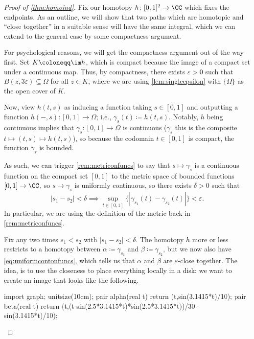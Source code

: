 \begin{proof}[Proof of \autoref{thm:homoind}]
	Fix our homotopy $h\colon [0,1]^2\to\CC$ which fixes the endpoints. As an outline, we will show that two paths which are homotopic and ``close together'' in a suitable sense will have the same integral, which we can extend to the general case by some compactness argument.
	
	For psychological reasons, we will get the compactness argument out of the way first. Set $K\coloneqq \im h$, which is compact because the image of a compact set under a continuous map. Thus, by compactness, there exists $\varepsilon>0$ such that $B(z,3\varepsilon)\subseteq\Omega$ for all $z\in K$, where we are using \autoref{lem:singleepsilon} with $\{\Omega\}$ as the open cover of $K$.

	Now, view $h(t,s)$ as inducing a function taking $s\in[0,1]$ and outputting a function $h(-,s)\colon [0,1]\to\Omega$; i.e., $\gamma_s(t)\coloneqq h(t,s)$. Notably, $h$ being continuous implies that $\gamma_s\colon [0,1]\to\Omega$ is continuous ($\gamma_s$ this is the composite $t\mapsto(t,s)\mapsto h(t,s)$), so because the codomain $t\in[0,1]$ is compact, the function $\gamma_s$ is bounded.
	
	As such, we can trigger \autoref{rem:metriconfuncs} to say that $s\mapsto\gamma_s$ is a continuous function on the compact set $[0,1]$ to the metric space of bounded functions $[0,1]\to\CC$, so $s\mapsto\gamma_s$ is uniformly continuous, so there exists $\delta>0$ such that
	\[|s_1-s_2|<\delta\implies\sup_{t\in[0,1]}\{|\gamma_{s_1}(t)-\gamma_{s_2}(t)|\}<\varepsilon.\tag{$*$}\label{eq:uniformcontonfuncs}\]
	In particular, we are using the definition of the metric back in \autoref{rem:metriconfuncs}.

	Fix any two times $s_1<s_2$ with $|s_1-s_2|<\delta$. The homotopy $h$ more or less restricts to a homotopy between $\alpha\coloneqq \gamma_{s_1}$ and $\beta\coloneqq \gamma_{s_2}$, but we now also have \autoref{eq:uniformcontonfuncs}, which tells us that $\alpha$ and $\beta$ are $\varepsilon$-close together. The idea, is to use the closeness to place everything locally in a disk: we want to create an image that looks like the following.
	\begin{center}
		\begin{asy}
			import graph;
			unitsize(10cm);
			pair alpha(real t)
			{
				return (t,sin(3.1415*t)/10);
			}
			pair beta(real t)
			{
				return (t,(t-sin(2.5*3.1415*t)*sin(2.5*3.1415*t))/30 - sin(3.1415*t)/10);
			}
	

\end{asy}
\end{center}
\end{proof}
